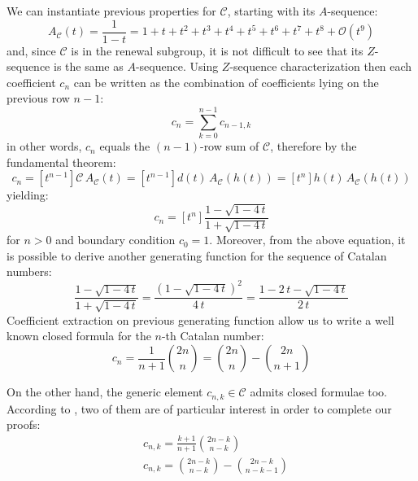 We can instantiate previous properties for $\mathcal{C}$, starting with its $A$-sequence:
\begin{displaymath}
    A_{\mathcal{C}}(t)=\frac{1}{1-t}=1+t+t^{2}+t^{3}+t^{4}+t^{5}+t^{6}+t^{7}+t^{8}+
        \mathcal{O}(t^{9})
\end{displaymath}
and, since $\mathcal{C}$ is in the renewal subgroup, it is not difficult to see that its
$Z$-sequence is the same as $A$-sequence. Using $Z$-sequence characterization then 
each coefficient $c_{n}$ can be written as the combination of coefficients lying on the previous row $n-1$:
\begin{displaymath}
    c_{n} = \sum_{k=0}^{n-1}{c_{n-1,k}}
\end{displaymath}
in other words, $c_{n}$ equals the $(n-1)$-row sum of $\mathcal{C}$, 
therefore by the fundamental theorem:
\begin{displaymath}
    c_{n} = [t^{n-1}]\mathcal{C}\,A_{\mathcal{C}}(t)
          = [t^{n-1}]d(t)\,A_{\mathcal{C}}(h(t))
          = [t^{n}]h(t)\,A_{\mathcal{C}}(h(t))
\end{displaymath}
yielding:
\begin{displaymath}
    c_{n} = [t^{n}]\frac{1-\sqrt{1-4 \, t}}{1+\sqrt{1-4 \, t}}
\end{displaymath}
for $n>0$ and boundary condition $c_{0}=1$. 
Moreover, from the above equation, it is possible to derive
another generating function for the sequence of Catalan numbers:
\begin{displaymath}
    \frac{1-\sqrt{1-4 \, t}}{1+\sqrt{1-4 \, t}}=
    \frac{\left(1-\sqrt{1-4 \, t}\right)^{2}}{4 \, t}=
    \frac{1-2\,t-\sqrt{1-4 \, t}}{2 \, t}
\end{displaymath}
Coefficient extraction on previous generating function allow us to write 
a well known closed formula for the $n$-th Catalan number:
\begin{equation}
    c_{n} = \frac{1}{n+1}{{2n}\choose{n}} 
        = {{2n}\choose{n}} - {{2n}\choose{n+1}}
    \label{eq:catalan:coeff:rewriting}
\end{equation}

On the other hand, the generic element $c_{n,k}\in\mathcal{C}$ 
admits closed formulae too. According to
\cite{luzon:2012631}, two of them are of
particular interest in order to complete our proofs:
\begin{eqnarray}
    & c_{n,k}=\frac{k+1}{n+1}{{2n-k}\choose{n-k}}
    \label{eq:catalan:array:first:identity}\\
    & c_{n,k}={{2n-k}\choose{n-k}} - {{2n-k}\choose{n-k-1}}
    \label{eq:catalan:array:second:identity}
\end{eqnarray}


